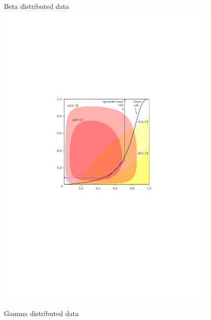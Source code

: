 \begin{figure}[ht]
  \begin{minipage}[t]{0.49\linewidth} \vspace{0mm}
    \centering
    Beta distributed data \\[2ex]
    \includegraphics[width=0.975\textwidth]{beta_cqc}
  \end{minipage}
  \begin{minipage}[t]{0.49\linewidth} \vspace{0mm}
    \centering
    Gamma distributed data \\[2ex]

\end{minipage}
\end{figure}

